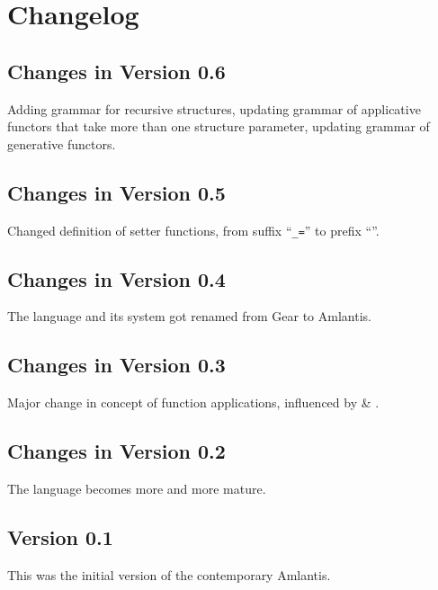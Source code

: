 
\chapter{Changelog}
\label{sec:changelog}

\section*{Changes in Version 0.6}

Adding grammar for recursive structures, updating grammar of applicative functors that take more than one structure parameter, updating grammar of generative functors. 

\section*{Changes in Version 0.5}

Changed definition of setter functions, from suffix ``\lstinline!_=!'' to prefix ``''. 

\section*{Changes in Version 0.4}

The language and its system got renamed from Gear to Amlantis. 

\section*{Changes in Version 0.3}

Major change in concept of function applications, influenced by  \& . 

\section*{Changes in Version 0.2}

The language becomes more and more mature.

\section*{Version 0.1}

This was the initial version of the contemporary Amlantis. 
